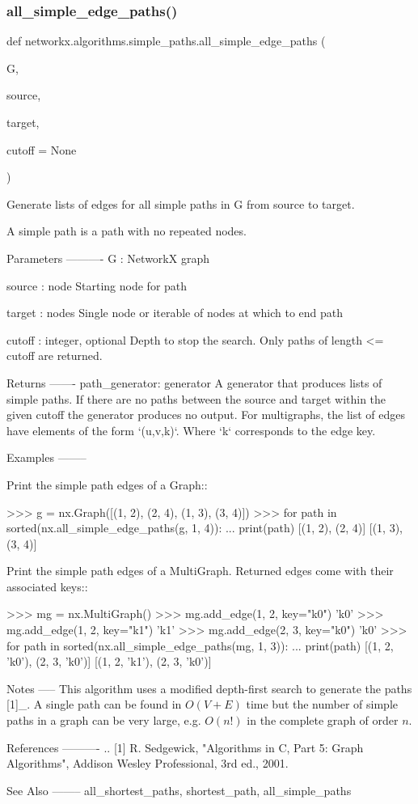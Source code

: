 \subsubsection{\texorpdfstring{all\+\_\+simple\+\_\+edge\+\_\+paths()}{all\_simple\_edge\_paths()}}
{\footnotesize\ttfamily def networkx.\+algorithms.\+simple\+\_\+paths.\+all\+\_\+simple\+\_\+edge\+\_\+paths (\begin{DoxyParamCaption}\item[{}]{G,  }\item[{}]{source,  }\item[{}]{target,  }\item[{}]{cutoff = {\ttfamily None} }\end{DoxyParamCaption})}

\begin{DoxyVerb}Generate lists of edges for all simple paths in G from source to target.

A simple path is a path with no repeated nodes.

Parameters
----------
G : NetworkX graph

source : node
   Starting node for path

target : nodes
   Single node or iterable of nodes at which to end path

cutoff : integer, optional
    Depth to stop the search. Only paths of length <= cutoff are returned.

Returns
-------
path_generator: generator
   A generator that produces lists of simple paths.  If there are no paths
   between the source and target within the given cutoff the generator
   produces no output.
   For multigraphs, the list of edges have elements of the form `(u,v,k)`.
   Where `k` corresponds to the edge key.

Examples
--------

Print the simple path edges of a Graph::

    >>> g = nx.Graph([(1, 2), (2, 4), (1, 3), (3, 4)])
    >>> for path in sorted(nx.all_simple_edge_paths(g, 1, 4)):
    ...     print(path)
    [(1, 2), (2, 4)]
    [(1, 3), (3, 4)]

Print the simple path edges of a MultiGraph. Returned edges come with
their associated keys::

    >>> mg = nx.MultiGraph()
    >>> mg.add_edge(1, 2, key="k0")
    'k0'
    >>> mg.add_edge(1, 2, key="k1")
    'k1'
    >>> mg.add_edge(2, 3, key="k0")
    'k0'
    >>> for path in sorted(nx.all_simple_edge_paths(mg, 1, 3)):
    ...     print(path)
    [(1, 2, 'k0'), (2, 3, 'k0')]
    [(1, 2, 'k1'), (2, 3, 'k0')]


Notes
-----
This algorithm uses a modified depth-first search to generate the
paths [1]_.  A single path can be found in $O(V+E)$ time but the
number of simple paths in a graph can be very large, e.g. $O(n!)$ in
the complete graph of order $n$.

References
----------
.. [1] R. Sedgewick, "Algorithms in C, Part 5: Graph Algorithms",
   Addison Wesley Professional, 3rd ed., 2001.

See Also
--------
all_shortest_paths, shortest_path, all_simple_paths\end{DoxyVerb}

